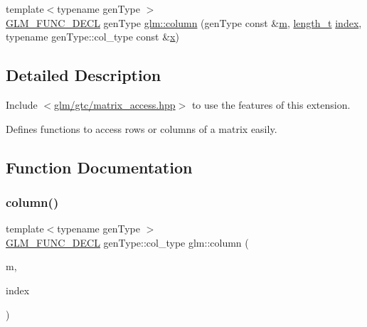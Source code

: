 \begin{DoxyCompactItemize}
\item 
{\footnotesize template$<$typename gen\+Type $>$ }\\\mbox{\hyperlink{setup_8hpp_ab2d052de21a70539923e9bcbf6e83a51}{G\+L\+M\+\_\+\+F\+U\+N\+C\+\_\+\+D\+E\+CL}} gen\+Type \mbox{\hyperlink{group__gtc__matrix__access_ga9e757377523890e8b80c5843dbe4dd15}{glm\+::column}} (gen\+Type const \&\mbox{\hyperlink{_s_d_l__opengl__glext_8h_af593500c283bf1a787a6f947f503a5c2}{m}}, \mbox{\hyperlink{namespaceglm_a090a0de2260835bee80e71a702492ed9}{length\+\_\+t}} \mbox{\hyperlink{_s_d_l__opengl__glext_8h_a57f14e05b1900f16a2da82ade47d0c6d}{index}}, typename gen\+Type\+::col\+\_\+type const \&\mbox{\hyperlink{_s_d_l__opengl_8h_ad0e63d0edcdbd3d79554076bf309fd47}{x}})
\end{DoxyCompactItemize}


\subsection{Detailed Description}
Include $<$\mbox{\hyperlink{matrix__access_8hpp}{glm/gtc/matrix\+\_\+access.\+hpp}}$>$ to use the features of this extension.

Defines functions to access rows or columns of a matrix easily. 

\subsection{Function Documentation}
\mbox{\label{group__gtc__matrix__access_ga96022eb0d3fae39d89fc7a954e59b374}} 
\subsubsection{\texorpdfstring{column()}{column()}\hspace{0.1cm}{\footnotesize\ttfamily [1/2]}}
{\footnotesize\ttfamily template$<$typename gen\+Type $>$ \\
\mbox{\hyperlink{setup_8hpp_ab2d052de21a70539923e9bcbf6e83a51}{G\+L\+M\+\_\+\+F\+U\+N\+C\+\_\+\+D\+E\+CL}} gen\+Type\+::col\+\_\+type glm\+::column (\begin{DoxyParamCaption}\item[{gen\+Type const \&}]{m,  }\item[{\mbox{\hyperlink{namespaceglm_a090a0de2260835bee80e71a702492ed9}{length\+\_\+t}}}]{index }\end{DoxyParamCaption})}

